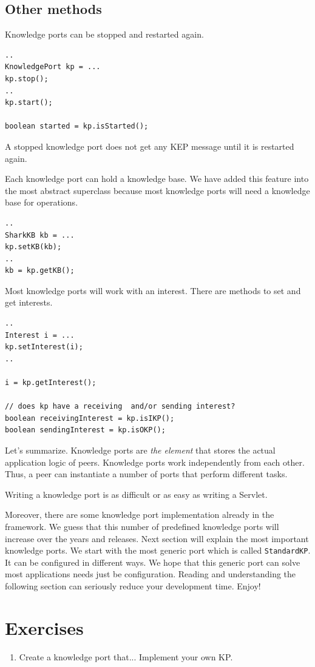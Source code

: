 \subsection{Other methods}
Knowledge ports can be stopped and restarted again.

\begin{verbatim}
..
KnowledgePort kp = ...
kp.stop();
..
kp.start();

boolean started = kp.isStarted();
\end{verbatim}

A stopped knowledge port does not get any KEP message until it is restarted again. 

Each knowledge port can hold a knowledge base. We have added this feature into the most abstract superclass because most knowledge ports will need a knowledge base for operations.

\begin{verbatim}
..
SharkKB kb = ...
kp.setKB(kb);
..
kb = kp.getKB();
\end{verbatim}

Most knowledge ports will work with an interest. There are methods to set and get interests.

\begin{verbatim}
..
Interest i = ...
kp.setInterest(i);
..

i = kp.getInterest();

// does kp have a receiving  and/or sending interest?
boolean receivingInterest = kp.isIKP();
boolean sendingInterest = kp.isOKP();
\end{verbatim}

Let's summarize. Knowledge ports are {\it the element} that stores the actual application logic of peers. Knowledge ports work independently from each other. Thus, a peer can instantiate a number of ports that perform different tasks.

Writing a knowledge port is as difficult or as easy as writing a Servlet. 

Moreover, there are some knowledge port implementation already in the framework. We guess that this number of predefined knowledge ports will increase over the years and releases. Next section will explain the most important knowledge ports. We start with the most generic port which is called {\tt StandardKP}. It can be configured in different ways. We hope that this generic port can solve most applications needs just be configuration. Reading and understanding the following section can seriously reduce your development time. Enjoy!

\section{Exercises}

\begin{enumerate}
\item 
Create a knowledge port that... Implement your own KP.
\end{enumerate}
